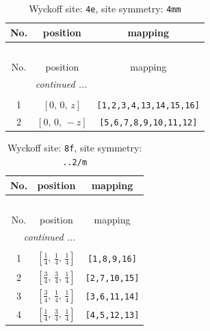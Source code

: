 \documentclass[fleqn,8pt]{jsarticle}
\begin{document}
\begin{longtable}{ccc}
\caption{Wyckoff site: {\tt 4e}, site symmetry: {\tt 4mm}}
 \\
 \hline \hline
No. & position & mapping \\ \hline \endfirsthead

\multicolumn{2}{l}{\tablename\ \thetable{}} \\
 \hline \hline
No. & position & mapping \\ \hline \endhead

 \hline \hline
\multicolumn{2}{r}{\footnotesize\it continued ...} \\ \endfoot

 \hline \hline
\multicolumn{2}{r}{} \\ \endlastfoot

1 & $\left[ 0,\, 0,\, z \right]$ & {\tt [1,2,3,4,13,14,15,16]} \\ \hline
2 & $\left[ 0,\, 0,\, - z \right]$ & {\tt [5,6,7,8,9,10,11,12]} \\
\end{longtable}
\renewcommand{\arraystretch}{1.2}
\begin{longtable}{ccc}
\caption{Wyckoff site: {\tt 8f}, site symmetry: {\tt ..2/m}}
 \\
 \hline \hline
No. & position & mapping \\ \hline \endfirsthead

\multicolumn{2}{l}{\tablename\ \thetable{}} \\
 \hline \hline
No. & position & mapping \\ \hline \endhead

 \hline \hline
\multicolumn{2}{r}{\footnotesize\it continued ...} \\ \endfoot

 \hline \hline
\multicolumn{2}{r}{} \\ \endlastfoot

1 & $\left[ \frac{1}{4},\, \frac{1}{4},\, \frac{1}{4} \right]$ & {\tt [1,8,9,16]} \\ \hline
2 & $\left[ \frac{3}{4},\, \frac{3}{4},\, \frac{1}{4} \right]$ & {\tt [2,7,10,15]} \\ \hline
3 & $\left[ \frac{3}{4},\, \frac{1}{4},\, \frac{1}{4} \right]$ & {\tt [3,6,11,14]} \\ \hline
4 & $\left[ \frac{1}{4},\, \frac{3}{4},\, \frac{1}{4} \right]$ & {\tt [4,5,12,13]} \\
\end{longtable}
\renewcommand{\arraystretch}{1.2}
\end{document}
